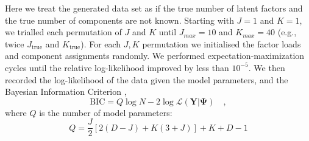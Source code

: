 \documentclass[twocolumn]{aastex61}
\newcommand{\vect}[1]{\boldsymbol{\mathbf{#1}}}
\renewcommand{\vec}[1]{\vect{#1}}
\newcommand{\data}{\textbf{Y}}
\newcommand{\NumDimensions}{D}
\newcommand{\NumLatentFactors}{J}
\newcommand{\NumComponents}{K}
\begin{document}



Here we treat the generated data set as if the true number of latent factors
and the true number of components are not known. Starting with $\NumLatentFactors = 1$
and $\NumComponents = 1$, we trialled each permutation of $\NumLatentFactors$ and $\NumComponents$
until $\NumLatentFactors_{max} = 10$
and   $\NumComponents_{max} = 40$ (e.g., twice $\NumLatentFactors_\textrm{true}$ and $\NumComponents_\textrm{true}$).
For each $\NumLatentFactors,\NumComponents$ permutation we initialised the factor
loads and component assignments randomly. We performed expectation-maximization 
cycles until the relative log-likelihood improved by less than $10^{-5}$. We then
recorded the log-likelihood of the data given the model parameters, and the
Bayesian Information Criterion \citep[BIC][]{Schwarz:1978}, 
\begin{equation}
	\textrm{BIC} = Q\log{N} - 2\log\mathcal{L}\left(\data|\vec\Psi\right) \quad , \label{eq:bic}
\end{equation} 
\noindent{}where $Q$ is the number of model parameters:
\begin{equation}
	Q = \frac{\NumLatentFactors}{2}\left[2\left(\NumDimensions - \NumLatentFactors\right) + \NumComponents\left(3 + \NumLatentFactors\right)\right] + \NumComponents + \NumDimensions - 1
\end{equation}
\end{document}
